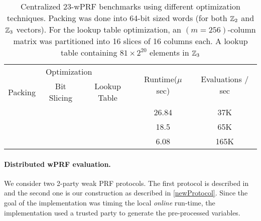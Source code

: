 \begin{table}[h]
	{
		\centering
		\begin{tabular}{|c|c|c|c|c|}
			
			\hline
			\multicolumn{3}{|c|}{Optimization} &  \multirow{2}{*}{Runtime($\mu$ sec)} & \multirow{2}{*}{Evaluations / sec} \\
			Packing & Bit Slicing & Lookup Table &  & \\
			\hline\hline
			\checkmark & & & 26.84 & 37K\\
			\checkmark & \checkmark & & 18.5 & 65K \\
			\checkmark & \checkmark & \checkmark & 6.08 & 165K \\
			\hline
		\end{tabular}
		\caption{Centralized 23-wPRF benchmarks using different optimization techniques. Packing was done into 64-bit sized words (for both $\mathbb{Z}_2$ and $\mathbb{Z}_3$ vectors). For the lookup table optimization, an $(m=256)$-column matrix was partitioned into 16 slices of 16 columns each. A lookup table containing $81 \times 2^{20}$ elements in $\mathbb{Z}_3$}
		\label{table:optimization_benchmarks}
	}
\end{table}


\paragraph{Distributed wPRF evaluation.}
We consider two 2-party weak PRF protocols. The first protocol is described in \cite{boneh2018-darkmatter} and the second one is our construction as described in \ref{newProtocol}. Since the goal of the implementation was timing the local {\em online} run-time, the implementation used a trusted party to generate the pre-processed variables.

